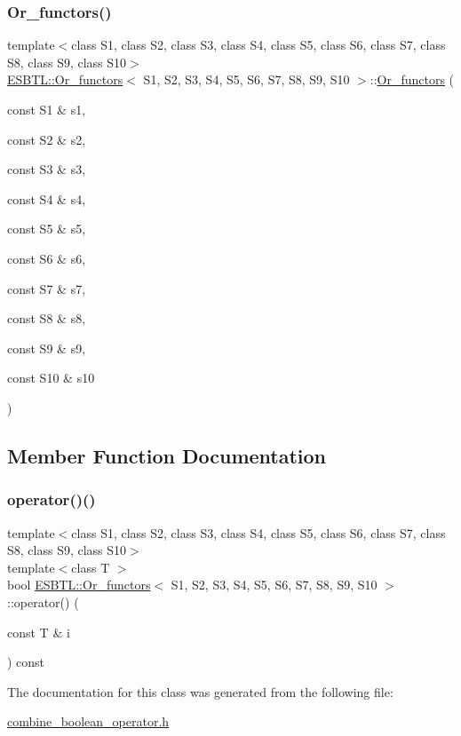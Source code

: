 \subsubsection{\texorpdfstring{Or\+\_\+functors()}{Or\_functors()}\hspace{0.1cm}{\footnotesize\ttfamily [2/2]}}
{\footnotesize\ttfamily template$<$class S1, class S2, class S3, class S4, class S5, class S6, class S7, class S8, class S9, class S10$>$ \\
\hyperlink{classESBTL_1_1Or__functors}{E\+S\+B\+T\+L\+::\+Or\+\_\+functors}$<$ S1, S2, S3, S4, S5, S6, S7, S8, S9, S10 $>$\+::\hyperlink{classESBTL_1_1Or__functors}{Or\+\_\+functors} (\begin{DoxyParamCaption}\item[{const S1 \&}]{s1,  }\item[{const S2 \&}]{s2,  }\item[{const S3 \&}]{s3,  }\item[{const S4 \&}]{s4,  }\item[{const S5 \&}]{s5,  }\item[{const S6 \&}]{s6,  }\item[{const S7 \&}]{s7,  }\item[{const S8 \&}]{s8,  }\item[{const S9 \&}]{s9,  }\item[{const S10 \&}]{s10 }\end{DoxyParamCaption})\hspace{0.3cm}{\ttfamily [inline]}}



\subsection{Member Function Documentation}
\mbox{\label{classESBTL_1_1Or__functors_a58797de9973d21d0cb431bbe2d98ec7a}} 
\subsubsection{\texorpdfstring{operator()()}{operator()()}}
{\footnotesize\ttfamily template$<$class S1, class S2, class S3, class S4, class S5, class S6, class S7, class S8, class S9, class S10$>$ \\
template$<$class T $>$ \\
bool \hyperlink{classESBTL_1_1Or__functors}{E\+S\+B\+T\+L\+::\+Or\+\_\+functors}$<$ S1, S2, S3, S4, S5, S6, S7, S8, S9, S10 $>$\+::operator() (\begin{DoxyParamCaption}\item[{const T \&}]{i }\end{DoxyParamCaption}) const\hspace{0.3cm}{\ttfamily [inline]}}



The documentation for this class was generated from the following file\+:\begin{DoxyCompactItemize}
\item 
\hyperlink{combine__boolean__operator_8h}{combine\+\_\+boolean\+\_\+operator.\+h}\end{DoxyCompactItemize}
